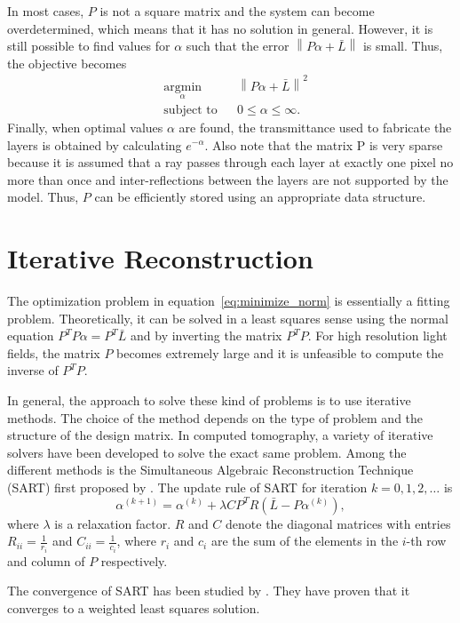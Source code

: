 In most cases, $P$ is not a square matrix and the system can become overdetermined, which means that it has no solution in general.
However, it is still possible to find values for $\alpha$ such that the error $\left\lVert P \alpha + \bar{L} \right\rVert$ is small. 
Thus, the objective becomes
\begin{equation} \label{eq:minimize_norm}
	\begin{aligned}
		& \underset{\alpha}{\text{argmin}} 	& & \left\lVert P \alpha + \bar{L} \right\rVert ^2 \\
		& \text{subject to} 				& & 0 \leq \alpha \leq \infty.
	\end{aligned}
\end{equation}
Finally, when optimal values $\alpha$ are found, the transmittance used to fabricate the layers is obtained by calculating $e^{-\alpha}$.
Also note that the matrix P is very sparse because it is assumed that a ray passes through each layer at exactly one pixel no more than once and inter-reflections between the layers are not supported by the model.
Thus, $P$ can be efficiently stored using an appropriate data structure.

\section{Iterative Reconstruction}


The optimization problem in equation~\ref{eq:minimize_norm} is essentially a fitting problem.
Theoretically, it can be solved in a least squares sense using the normal equation $P^T P \alpha = P^T \bar{L}$ and by inverting the matrix $P^T P$.
For high resolution light fields, the matrix $P$ becomes extremely large and it is unfeasible to compute the inverse of $P^T P$.

In general, the approach to solve these kind of problems is to use iterative methods.
The choice of the method depends on the type of problem and the structure of the design matrix.
In computed tomography, a variety of iterative solvers have been developed to solve the exact same problem. 
Among the different methods is the Simultaneous Algebraic Reconstruction Technique (\mbox{SART}) first proposed by \cite{SART}.
The update rule of \mbox{SART} for iteration $k = 0, 1, 2, \dots$ is
\begin{equation}\label{eq:SART_update_rule}
	\alpha^{(k + 1)} = \alpha^{(k)} + \lambda C P^T R \left( \bar{L} - P \alpha^{(k)} \right), 	
\end{equation}
where $\lambda$ is a relaxation factor.
$R$ and $C$ denote the diagonal matrices with entries $R_{ii} = \frac{1}{r_i}$ and $C_{ii} = \frac{1}{c_i}$, where $r_i$ and $c_i$ are the sum of the elements in the \mbox{$i$-th} row and column of $P$ respectively.

The convergence of \mbox{SART} has been studied by \cite{ConvergenceSART2}.
They have proven that it converges to a weighted least squares solution.